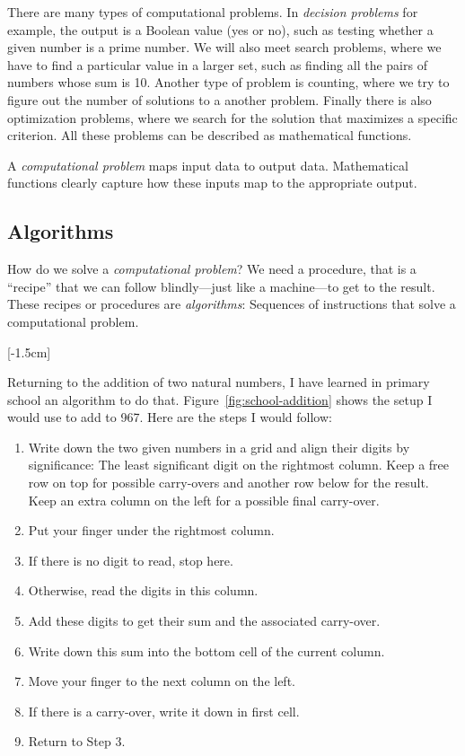 \documentclass{aldast}
\begin{document}
There are many types of computational problems. In \emph{decision
  problems} for example, the output is a Boolean value (yes or no),
such as testing whether a given number is a prime number. We will also
meet search problems, where we have to find a particular value in a
larger set, such as finding all the pairs of numbers whose sum is
10. Another type of problem is counting, where we try to figure out
the number of solutions to a another problem. Finally there is also
optimization problems, where we search for the solution that maximizes
a specific criterion. All these problems can be described as
mathematical functions.

\begin{takeaway}
  A \emph{computational problem} maps input data to output
  data. Mathematical functions clearly capture how these inputs map to
  the appropriate output.
\end{takeaway}

\subsection{Algorithms}

How do we solve a \emph{computational problem}? We need a procedure,
that is a ``recipe'' that we can follow blindly---just like a
machine---to get to the result. These recipes or procedures are
\emph{algorithms}: Sequences of instructions that solve a
computational problem.

[-1.5cm]

Returning to the addition of two natural numbers, I have learned in
primary school an algorithm to do
that. Figure~\ref{fig:school-addition} shows the setup I would use to
add  to 967. Here are the steps I would follow:
\begin{enumerate}
\item Write down the two given numbers in a grid and align their
  digits by significance: The least significant digit on the rightmost
  column. Keep a free row on top for possible carry-overs and
  another row below for the result. Keep an extra column on
  the left for a possible final carry-over.
\item Put your finger under the rightmost column.
\item If there is no digit to read, stop here.
\item Otherwise, read the digits in this column.
\item Add these digits to get their sum and the associated carry-over.
\item Write down this sum into the bottom cell of the current column.
\item Move your finger to the next column on the left.
\item If there is a carry-over, write it down in first cell.
\item Return to Step 3.
\end{enumerate}
\end{document}
